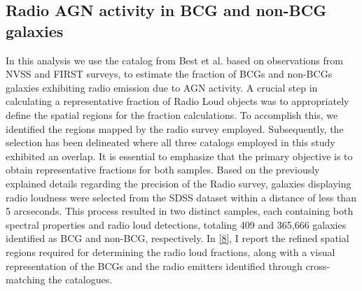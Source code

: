 \subsection{Radio AGN activity in BCG and non-BCG galaxies}
In this analysis we use the catalog from Best et al. \cite{2005MNRAS.362....9B} based on observations from NVSS and FIRST surveys, to estimate the fraction of BCGs and non-BCGs galaxies exhibiting radio emission due to AGN activity.
A crucial step in calculating a representative fraction of Radio Loud objects was to appropriately define the spatial regions for the fraction calculations. To accomplish this, we identified the regions mapped by the radio survey employed. Subsequently, the selection has been delineated where all three catalogs employed in this study exhibited an overlap. It is essential to emphasize that the primary objective is to obtain representative fractions for both samples.
Based on the previously explained details regarding the precision of the Radio survey, galaxies displaying radio loudness were selected from the SDSS dataset within a distance of less than 5 arcseconds. This process resulted in two distinct samples, each containing both spectral properties and radio loud detections, totaling 409 and 365,666 galaxies identified as BCG and non-BCG, respectively. In \autoref{8}, I report the refined spatial regions required for determining the radio loud fractions, along with a visual representation of the BCGs and the radio emitters identified through cross-matching the catalogues.


